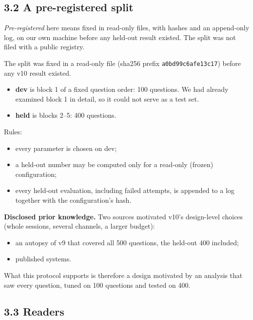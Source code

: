 \documentclass[11pt]{article}
\providecommand{\tightlist}{\setlength{\itemsep}{0pt}\setlength{\parskip}{0pt}}
\begin{document}
\hypertarget{a-pre-registered-split}{%
\subsection{3.2 A pre-registered split}\label{a-pre-registered-split}}

\emph{Pre-registered} here means fixed in read-only files, with hashes and an append-only log, on our own machine
before any held-out result existed. The split was not filed with a public registry.

The split was fixed in a read-only file (sha256 prefix \texttt{a0bd99c6afe13c17}) before any v10 result existed.

\begin{itemize}
\tightlist
\item
  \textbf{dev} is block 1 of a fixed question order: 100 questions. We had already examined block 1 in detail,
  so it could not serve as a test set.
\item
  \textbf{held} is blocks 2--5: 400 questions.
\end{itemize}

Rules:

\begin{itemize}
\tightlist
\item
  every parameter is chosen on dev;
\item
  a held-out number may be computed only for a read-only (frozen) configuration;
\item
  every held-out evaluation, including failed attempts, is appended to a log together with the
  configuration's hash.
\end{itemize}

\textbf{Disclosed prior knowledge.} Two sources motivated v10's design-level choices (whole sessions, several
channels, a larger budget):

\begin{itemize}
\tightlist
\item
  an autopsy of v9 that covered all 500 questions, the held-out 400 included;
\item
  published systems.
\end{itemize}

What this protocol supports is therefore a design motivated by an analysis that saw every question, tuned
on 100 questions and tested on 400.

\hypertarget{readers}{%
\subsection{3.3 Readers}\label{readers}}
\end{document}
